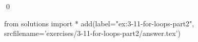 
\begin{ex}
  \label{ex:3-11-for-loops-part2}
  
  \qed
\end{ex}
\begin{python0}
from solutions import *
add(label="ex:3-11-for-loops-part2",
    srcfilename='exercises/3-11-for-loops-part2/answer.tex')
\end{python0}
